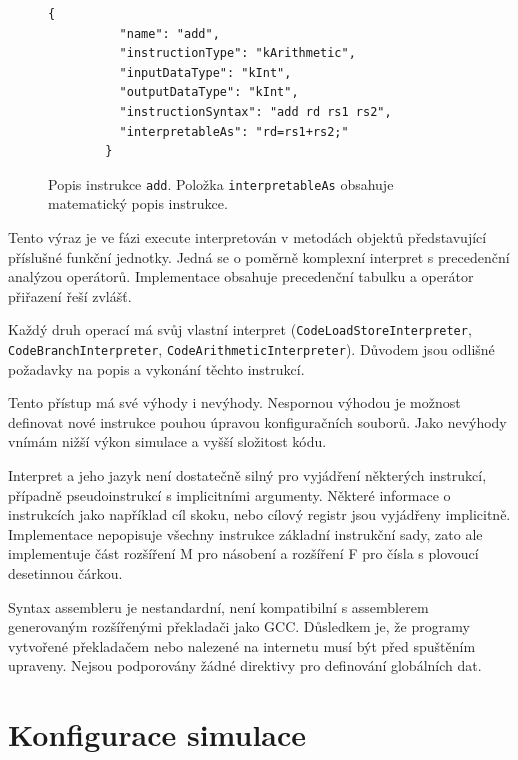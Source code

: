\begin{figure}[hbtp]
    \begin{lstlisting}[]
        {
          "name": "add",
          "instructionType": "kArithmetic",
          "inputDataType": "kInt",
          "outputDataType": "kInt",
          "instructionSyntax": "add rd rs1 rs2",
          "interpretableAs": "rd=rs1+rs2;"
        }
    \end{lstlisting}
    \caption{Popis instrukce \texttt{add}. Položka \texttt{interpretableAs} obsahuje matematický popis instrukce.}
    \label{code.1}
\end{figure}

Tento výraz je ve fázi execute interpretován v metodách objektů představující příslušné funkční jednotky.
Jedná se o poměrně komplexní interpret s precedenční analýzou operátorů.
Implementace obsahuje precedenční tabulku a operátor přiřazení řeší zvlášť.

Každý druh operací má svůj vlastní interpret (\texttt{Code\-Load\-Store\-Interpreter}, \texttt{Code\-Branch\-Interpreter}, \texttt{Code\-Arithmetic\-Interpreter}).
Důvodem jsou odlišné požadavky na popis a vykonání těchto instrukcí.

Tento přístup má své výhody i nevýhody.
Nespornou výhodou je možnost definovat nové instrukce pouhou úpravou konfiguračních souborů.
Jako nevýhody vnímám nižší výkon simulace a vyšší složitost kódu.

Interpret a jeho jazyk není dostatečně silný pro vyjádření některých instrukcí, případně pseudoinstrukcí s implicitními argumenty.
Některé informace o instrukcích jako například cíl skoku, nebo cílový registr jsou vyjádřeny implicitně.
Implementace nepopisuje všechny instrukce základní instrukční sady, zato ale implementuje část rozšíření M pro násobení a rozšíření F pro čísla s plovoucí desetinnou čárkou.

Syntax assembleru je nestandardní, není kompatibilní s assemblerem generovaným rozšířenými překladači jako GCC.
Důsledkem je, že programy vytvořené překladačem nebo nalezené na internetu musí být před spuštěním upraveny.
Nejsou podporovány žádné direktivy pro definování globálních dat.

\section{Konfigurace simulace}

